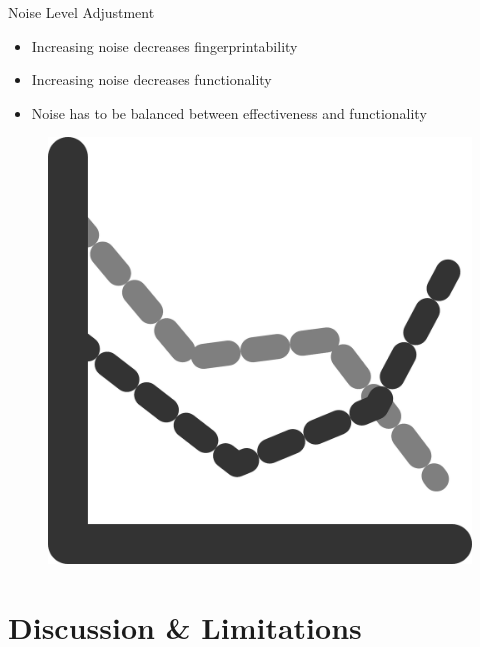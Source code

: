 \documentclass[aspectratio=169]{beamer}
[aspectratio=169] %
\begin{document}

\begin{frame}{Noise Level Adjustment}
  \begin{minipage}{0.49\textwidth} 
    \begin{itemize}
      \item Increasing noise decreases fingerprintability
      \item Increasing noise decreases functionality
      \item Noise has to be balanced between effectiveness and functionality
    \end{itemize}
  \end{minipage}
  \hfill
  \begin{minipage}{0.49\textwidth} 
    \begin{figure}
      \centering
      \includegraphics[height=0.5\textheight]{figures/graph.png}
    \end{figure}
  \end{minipage}
\end{frame}


\section{Discussion \& Limitations}
\end{document}
